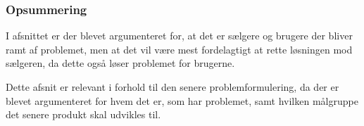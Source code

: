 \subsubsection*{Opsummering}
I afsnittet er der blevet argumenteret for, at det er sælgere og brugere der bliver ramt af problemet, men at det vil være mest fordelagtigt at rette løsningen mod sælgeren, da dette også løser problemet for brugerne.

Dette afsnit er relevant i forhold til den senere problemformulering, da der er blevet argumenteret for hvem det er, som har problemet, samt hvilken målgruppe det senere produkt skal udvikles til.
